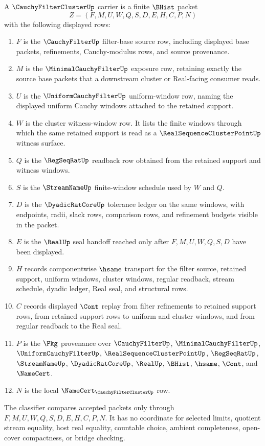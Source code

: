 \begin{definition}\label{def:cauchy-filter-cluster-carrier}
A $\CauchyFilterClusterUp$ carrier is a finite $\BHist$ packet
$$
Z=(F,M,U,W,Q,S,D,E,H,C,P,N)
$$
with the following displayed rows:
\begin{enumerate}
\item $F$ is the $\CauchyFilterUp$ filter-base source row, including displayed base packets, refinements, Cauchy-modulus rows, and source provenance.
\item $M$ is the $\MinimalCauchyFilterUp$ exposure row, retaining exactly the source base packets that a downstream cluster or Real-facing consumer reads.
\item $U$ is the $\UniformCauchyFilterUp$ uniform-window row, naming the displayed uniform Cauchy windows attached to the retained support.
\item $W$ is the cluster witness-window row. It lists the finite windows through which the same retained support is read as a $\RealSequenceClusterPointUp$ witness surface.
\item $Q$ is the $\RegSeqRatUp$ readback row obtained from the retained support and witness windows.
\item $S$ is the $\StreamNameUp$ finite-window schedule used by $W$ and $Q$.
\item $D$ is the $\DyadicRatCoreUp$ tolerance ledger on the same windows, with endpoints, radii, slack rows, comparison rows, and refinement budgets visible in the packet.
\item $E$ is the $\RealUp$ seal handoff reached only after $F,M,U,W,Q,S,D$ have been displayed.
\item $H$ records componentwise $\hsame$ transport for the filter source, retained support, uniform windows, cluster windows, regular readback, stream schedule, dyadic ledger, Real seal, and structural rows.
\item $C$ records displayed $\Cont$ replay from filter refinements to retained support rows, from retained support rows to uniform and cluster windows, and from regular readback to the Real seal.
\item $P$ is the $\Pkg$ provenance over $\CauchyFilterUp$, $\MinimalCauchyFilterUp$, $\UniformCauchyFilterUp$, $\RealSequenceClusterPointUp$, $\RegSeqRatUp$, $\StreamNameUp$, $\DyadicRatCoreUp$, $\RealUp$, $\BHist$, $\hsame$, $\Cont$, and $\NameCert$.
\item $N$ is the local $\NameCert_{\CauchyFilterClusterUp}$ row.
\end{enumerate}
The classifier compares accepted packets only through $F,M,U,W,Q,S,D,E,H,C,P,N$. It has no coordinate for selected limits, quotient stream equality, host real equality, countable choice, ambient completeness, open-cover compactness, or bridge checking.
\end{definition}

